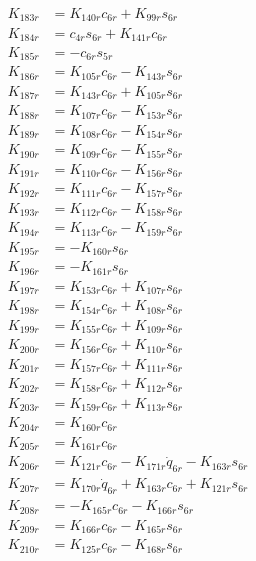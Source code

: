 \begin{multicols}{2}
\begin{align}
K_{183r} &= K_{140r}c_{6r} + K_{99r}s_{6r} \nonumber \\
K_{184r} &= c_{4r}s_{6r} + K_{141r}c_{6r} \nonumber \\
K_{185r} &= -c_{6r}s_{5r} \nonumber \\
K_{186r} &= K_{105r}c_{6r} - K_{143r}s_{6r} \nonumber \\
K_{187r} &= K_{143r}c_{6r} + K_{105r}s_{6r} \nonumber \\
K_{188r} &= K_{107r}c_{6r} - K_{153r}s_{6r} \nonumber \\
K_{189r} &= K_{108r}c_{6r} - K_{154r}s_{6r} \nonumber \\
K_{190r} &= K_{109r}c_{6r} - K_{155r}s_{6r} \nonumber \\
K_{191r} &= K_{110r}c_{6r} - K_{156r}s_{6r} \nonumber \\
K_{192r} &= K_{111r}c_{6r} - K_{157r}s_{6r} \nonumber \\
K_{193r} &= K_{112r}c_{6r} - K_{158r}s_{6r} \nonumber \\
K_{194r} &= K_{113r}c_{6r} - K_{159r}s_{6r} \nonumber \\
K_{195r} &= -K_{160r}s_{6r} \nonumber \\
K_{196r} &= -K_{161r}s_{6r} \nonumber \\
K_{197r} &= K_{153r}c_{6r} + K_{107r}s_{6r} \nonumber \\
K_{198r} &= K_{154r}c_{6r} + K_{108r}s_{6r} \nonumber \\
K_{199r} &= K_{155r}c_{6r} + K_{109r}s_{6r} \nonumber \\
K_{200r} &= K_{156r}c_{6r} + K_{110r}s_{6r} \nonumber \\
K_{201r} &= K_{157r}c_{6r} + K_{111r}s_{6r} \nonumber \\
K_{202r} &= K_{158r}c_{6r} + K_{112r}s_{6r} \nonumber \\
K_{203r} &= K_{159r}c_{6r} + K_{113r}s_{6r} \nonumber \\
K_{204r} &= K_{160r}c_{6r} \nonumber \\
K_{205r} &= K_{161r}c_{6r} \nonumber \\
K_{206r} &= K_{121r}c_{6r} - K_{171r}\dot{q}_{6r} - K_{163r}s_{6r} \nonumber \\
K_{207r} &= K_{170r}\dot{q}_{6r} + K_{163r}c_{6r} + K_{121r}s_{6r} \nonumber \\
K_{208r} &= - K_{165r}c_{6r} - K_{166r}s_{6r} \nonumber \\
K_{209r} &= K_{166r}c_{6r} - K_{165r}s_{6r} \nonumber \\
K_{210r} &= K_{125r}c_{6r} - K_{168r}s_{6r} \nonumber \\

\end{align}
\end{multicols}
